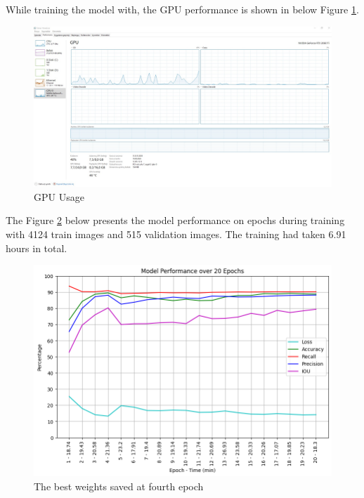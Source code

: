 While training the model with, the GPU performance is shown in below Figure \ref{performance_gpu}. 
\begin{figure}[htp]
    \centering
    \includegraphics[width=15cm]{projectChapters/images/performance_gpu.jpeg}
    \caption{GPU Usage}
    \label{performance_gpu}
\end{figure}

\newpage
The Figure \ref{epoch_table} below presents the model performance on epochs during training with 4124 train images and 515 validation images. The training had taken 6.91 hours in total. 

\begin{figure}[htp]
    \centering
    \includegraphics[width=15cm]{projectChapters/images/epoch_table.png}
    \caption{The best weights saved at fourth epoch}
    \label{epoch_table}
\end{figure}
